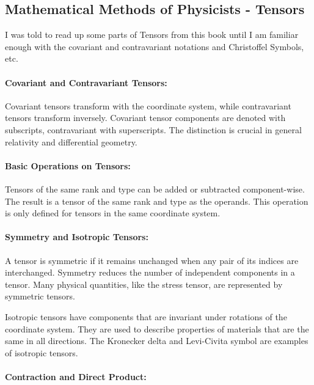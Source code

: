 \documentclass[11pt]{article}
\begin{document}
\subsection{Mathematical Methods of Physicists - Tensors}

I was told to read up some parts of Tensors from this book until I am familiar
enough with the covariant and contravariant notations and
Christoffel Symbols, etc.


\paragraph{Covariant and Contravariant Tensors:}

Covariant tensors transform with the coordinate system, while contravariant tensors transform inversely.
Covariant tensor components are denoted with subscripts, contravariant with superscripts.
The distinction is crucial in general relativity and differential geometry.

\paragraph{Basic Operations on Tensors:}

Tensors of the same rank and type can be added or subtracted component-wise.
The result is a tensor of the same rank and type as the operands.
This operation is only defined for tensors in the same coordinate system.

\paragraph{Symmetry and Isotropic Tensors:}

A tensor is symmetric if it remains unchanged when any pair of its indices are interchanged.
Symmetry reduces the number of independent components in a tensor.
Many physical quantities, like the stress tensor, are represented by symmetric tensors.

Isotropic tensors have components that are invariant under rotations of the coordinate system.
They are used to describe properties of materials that are the same in all directions.
The Kronecker delta and Levi-Civita symbol are examples of isotropic tensors.

\paragraph{Contraction and Direct Product:}
\end{document}
